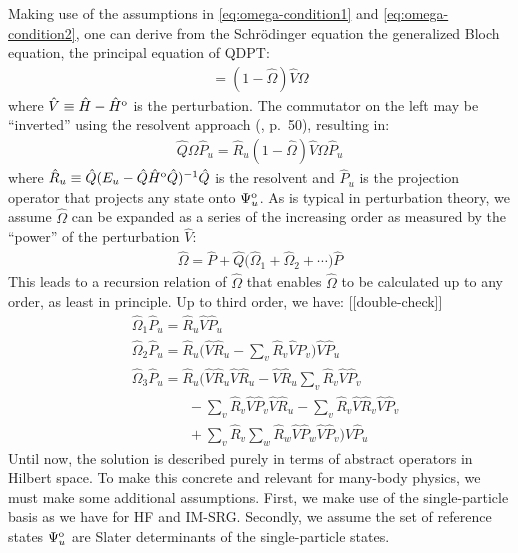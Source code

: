 Making use of the assumptions in  \eqref{eq:omega-condition1} and \eqref{eq:omega-condition2}, one can derive from the Schr\"odinger equation the generalized Bloch equation, the principal equation of QDPT:
\begin{gather*}
  [\hat \Omega, \hat H^{\text o}] =
  (1 - \hat \Omega) \hat V \Omega
\end{gather*}
where $\hat V \equiv \hat H - \hat H^{\text o}$ is the perturbation.  The
commutator on the left may be ``inverted'' using the resolvent approach
(\cite{shavitt2009many}, p.\ 50), resulting in:
\begin{align*}
  \hat Q \Omega \hat P_u =
  \hat R_u (1 - \hat \Omega) \hat V \Omega \hat P_u
\end{align*}
where $\hat R_u \equiv \hat Q (E_u - \hat Q \hat H^{\text o} \hat Q)^{-1} \hat Q$ is the resolvent and $\hat P_u$ is the projection operator that projects any state onto $\Psi^{\text o}_u$.  As is typical in perturbation theory, we assume $\hat \Omega$ can be expanded as a series of the increasing order as measured by the ``power'' of the perturbation $\hat V$:
\begin{align*}
  \hat \Omega = \hat P +
  \hat Q\bigl(\hat \Omega_1 + \hat \Omega_2 + \cdots\bigr) \hat P
\end{align*}
This leads to a recursion relation of $\hat \Omega$ that enables $\hat \Omega$ to be calculated up to any order, as least in principle.  Up to third order, we have: [[double-check]]
\begin{align*}
  &\hat \Omega_1 \hat P_u = \hat R_u \hat V \hat P_u \\
  &\hat \Omega_2 \hat P_u =
    \hat R_u \biggl(
    \hat V \hat R_u
    - \sum_v \hat R_v \hat V \hat P_v
    \biggr) \hat V \hat P_u \\
  &\hat \Omega_3 \hat P_u =
    \hat R_u \biggl(
    \hat V \hat R_u \hat V \hat R_u
    - \hat V \hat R_u \sum_v \hat R_v \hat V \hat P_v \\
  &\qquad\qquad
    - \sum_v \hat R_v \hat V \hat P_v \hat V \hat R_u
    - \sum_v \hat R_v \hat V \hat R_v \hat V \hat P_v \\
  &\qquad\qquad
    + \sum_v \hat R_v \sum_w \hat R_w \hat V \hat P_w \hat V \hat P_v
    \biggr) \hat V \hat P_u
\end{align*}
Until now, the solution is described purely in terms of abstract operators in Hilbert space.  To make this concrete and relevant for many-body physics, we must make some additional assumptions.  First, we make use of the single-particle basis as we have for HF and IM-SRG.  Secondly, we assume the set of reference states $\Psi^{\text o}_u$ are Slater determinants of the single-particle states.

